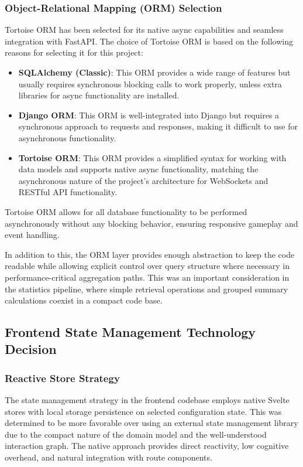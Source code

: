\vspace{\baselineskip}

\subsubsection{Object-Relational Mapping (ORM) Selection}
Tortoise ORM has been selected for its native async capabilities and seamless integration with FastAPI. The choice of Tortoise ORM is based on the following reasons for selecting it for this project:
\begin{itemize}
    \item \textbf{SQLAlchemy (Classic)}: This ORM provides a wide range of features but usually requires synchronous blocking calls to work properly, unless extra libraries for async functionality are installed.
    \item \textbf{Django ORM}: This ORM is well-integrated into Django but requires a synchronous approach to requests and responses, making it difficult to use for asynchronous functionality.
    \item \textbf{Tortoise ORM}: This ORM provides a simplified syntax for working with data models and supports native async functionality, matching the asynchronous nature of the project's architecture for WebSockets and RESTful API functionality.
\end{itemize}
Tortoise ORM allows for all database functionality to be performed asynchronously without any blocking behavior, ensuring responsive gameplay and event handling.

In addition to this, the ORM layer provides enough abstraction to keep the code readable while allowing explicit control over query structure where necessary in performance-critical aggregation paths. This was an important consideration in the statistics pipeline, where simple retrieval operations and grouped summary calculations coexist in a compact code base.

\subsection{Frontend State Management Technology Decision}

\subsubsection{Reactive Store Strategy}
The state management strategy in the frontend codebase employs native Svelte stores with local storage persistence on selected configuration state. This was determined to be more favorable over using an external state management library due to the compact nature of the domain model and the well-understood interaction graph. The native approach provides direct reactivity, low cognitive overhead, and natural integration with route components.

